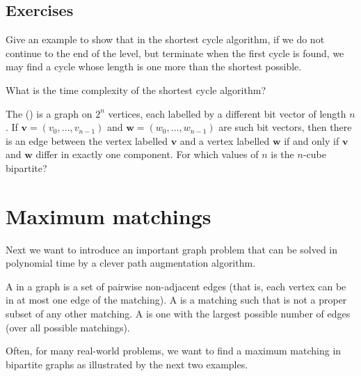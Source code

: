 \subsection*{Exercises}

\begin{Exercise}
\label{ex:shortest-cycle-thm}
Give an example to show that in the shortest cycle algorithm, if we
do not continue to the end of the level, but terminate when the first
cycle is found, we may find a cycle whose length is one more than the
shortest possible.
\end{Exercise}

\begin{Exercise}
\label{ex:shortest-cycle-runtime}
What is the time complexity of the shortest cycle algorithm?
\end{Exercise}

\begin{Exercise}
\label{ex:do2col}
The  () is a 
graph on $2^n$ vertices, each labelled by
a different bit vector of length $n$. If $\mathbf{v} = (v_0, \dots ,
v_{n-1})$ and $\mathbf{w} = (w_0, \dots , w_{n-1})$ are such bit vectors,
then there is an edge between the vertex labelled $\mathbf{v}$ and a
vertex labelled $\mathbf{w}$ if and only if $\mathbf{v}$ and $\mathbf{w}$
differ in exactly one component. For which values of $n$ is the $n$-cube
bipartite?
\end{Exercise}

\section{Maximum matchings}
\label{sec:matching}

Next we want to introduce an important graph problem that can
be solved in polynomial time by a clever path augmentation algorithm.  

\begin{Definition}
A  in a graph is a set of pairwise non-adjacent edges
(that is, each vertex can be in at most one edge of the matching).
A  is a matching such that is not a proper subset
of any other matching.
A  is one with the largest possible number of
edges (over all possible matchings).
\end{Definition}

Often, for many real-world problems, we want to find a maximum matching 
in bipartite graphs as illustrated by the next two examples.  

